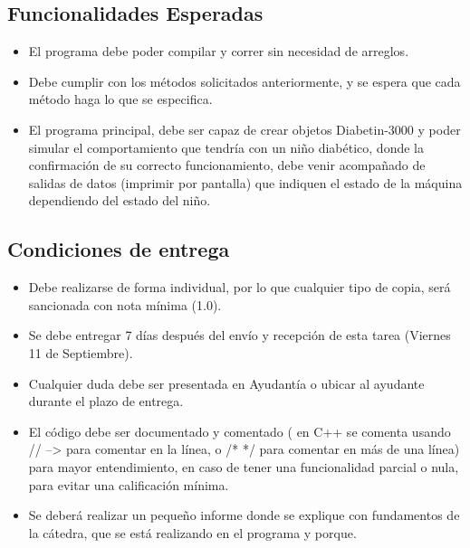 \documentclass[paper=a4, fontsize=11pt]{scrartcl} %
\numberwithin{equation}{section} %
\numberwithin{figure}{section} %
\numberwithin{table}{section} %
\begin{document}
\subsection{Funcionalidades Esperadas}
\begin{itemize}
\item El programa debe poder compilar y correr sin necesidad de arreglos.\\
\item Debe cumplir con los métodos solicitados anteriormente, y se espera que cada método haga lo que se especifica.\\
\item El programa principal, debe ser capaz de crear objetos Diabetin-3000 y poder simular el comportamiento que tendría con un niño diabético, donde la confirmación de su correcto funcionamiento, debe venir acompañado de salidas de datos (imprimir por pantalla) que indiquen el estado de la máquina dependiendo del estado del niño.\\
\end{itemize}


\newpage
\subsection{Condiciones de entrega}
\begin{itemize}
\item Debe realizarse de forma individual, por lo que cualquier tipo de copia, será sancionada con nota mínima (1.0).\\
\item Se debe entregar 7 días después del envío y recepción de esta tarea (Viernes 11 de Septiembre).\\
\item Cualquier duda debe ser presentada en Ayudantía o ubicar al ayudante durante el plazo de entrega.\\
\item El código debe ser documentado y comentado ( en C++ se comenta usando // --> para comentar en la línea, o /* */ para comentar en más de una línea) para mayor entendimiento, en caso de tener una funcionalidad parcial o nula, para evitar una calificación mínima.\\
\item Se deberá realizar un pequeño informe donde se explique con fundamentos de la cátedra, que se está realizando en el programa y porque.\\
\end{itemize}
\end{document}
